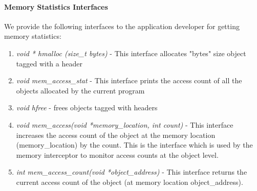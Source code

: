 \paragraph{Memory Statistics Interfaces}
We provide the following interfaces to the application developer for getting memory statistics:
\begin{enumerate}
\item {\emph{void * hmalloc (size\_t bytes)}} - This interface allocates "bytes" size object tagged with a header
\item {\emph{void mem\_access\_stat}} - This interface prints the access count of all the objects allocated by the current program
\item {\emph{void hfree}} - frees objects tagged with headers
\item{\emph{void mem\_access(void *memory\_location, int count)}} - This interface increases the access count of the object at the memory location (memory\_location) by the count. This is the interface which is used by the memory interceptor to monitor access counts at the object level.
\item {\emph{int mem\_access\_count(void *object\_address)}} - This interface returns the current access count of the object (at memory location object\_address).
\end{enumerate}
